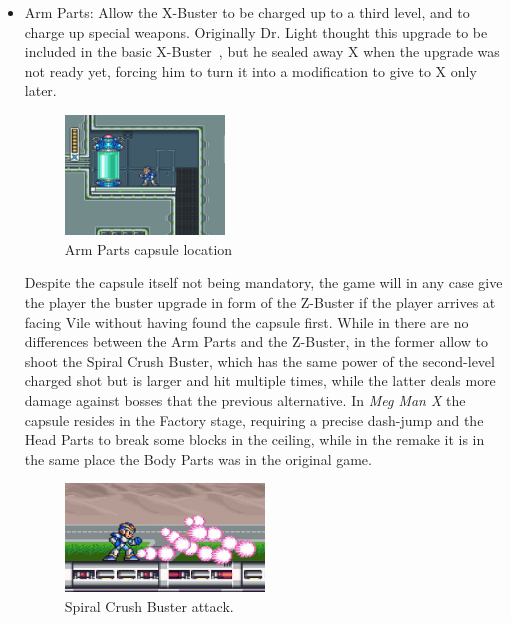 \begin{itemize}
	\item Arm Parts: Allow the X-Buster to be charged up to a third level, and to charge up special weapons. Originally Dr. Light thought this upgrade to be included in the basic X-Buster~\cite{X:Manual}, but he sealed away X when the upgrade was not ready yet, forcing him to turn it into a modification to give to X only later.
	\begin{figure}[htp]
		\centering
		\includegraphics[width=0.4\textwidth]{figures/X1/Flame_mammoth/Flame_armor_2.jpg}
		\caption{Arm Parts capsule location}
	\end{figure}
	
	Despite the capsule itself not being mandatory, the game will in any case give the player the buster upgrade in form of the Z-Buster if the player arrives at facing Vile without having found the capsule first. While in \x there are no differences between the Arm Parts and the Z-Buster, in \mhx the former allow to shoot the Spiral Crush Buster, which has the same power of the second-level charged shot but is larger and hit multiple times, while the latter deals more damage against bosses that the previous alternative. In \textit{Meg Man X} the capsule resides in the Factory stage, requiring a precise dash-jump and the Head Parts to break some blocks in the ceiling, while in the remake it is in the same place the Body Parts was in the original game.
	\begin{figure}[htp]
		\centering
		\includegraphics[width=0.5\textwidth]{figures/X1/weapons/Buster_4.jpg}
		\caption{Spiral Crush Buster attack.}
	\end{figure}
	

\end{itemize}
